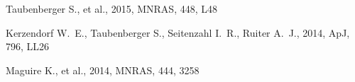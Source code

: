 \documentclass[11pt]{article}
\begin{document}
\bandthreeplan    %


\bigskip



\classicalbackup    %


\bigskip



\justifyduplications


\bigskip


% 

\publications          %
 Taubenberger S., et al., 2015, MNRAS, 448, 
L48 

 Kerzendorf W.~E., Taubenberger S., 
Seitenzahl I.~R., Ruiter A.~J., 2014, ApJ, 796, LL26

 Maguire K., et al., 2014, MNRAS, 444, 3258
\bigskip
\end{document}

